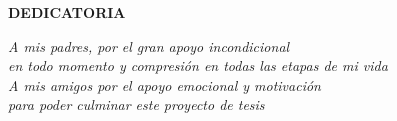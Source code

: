 \begin{titlepage}
    \begin{center}
        
        {\large \bf DEDICATORIA}\\[1cm]
        \vspace*{13cm} %
        
        \begin{flushright}
            \textit{A mis padres, por el gran apoyo incondicional}\\[0.5cm]
            \textit{en todo momento y compresión en todas las etapas de mi vida}\\[1.5cm]
            \textit{A mis amigos por el apoyo emocional y motivación}\\[0.5cm]
            \textit{para poder culminar este proyecto de tesis}\\[0.5cm]
            
            \end{flushright}
        
        \vfill %
    \end{center}
\end{titlepage}
